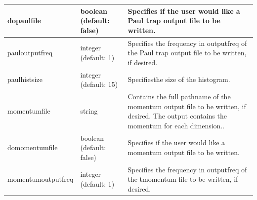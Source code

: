 \documentclass[11pt]{report}
\begin{document}
\begin{tabular}{|p{5.5cm}|p{4cm}|p{6cm}|}
    dopaulfile &
    boolean (default: false) &
    Specifies if the user would like a Paul trap output  file to be written. \\\hline


    pauloutputfreq &
    integer (default: 1) &
    Specifies the frequency in outputfreq of the Paul trap output  file to be written, if desired.\\\hline

    paulhistsize &
    integer (default: 15) &
    Specifiesthe size of the histogram.\\\hline

    momentumfile &
    string &
    Contains the full pathname of the momentum output file to be written, if
    desired.  The output contains the momentum for each dimension..\\\hline

    domomentumfile &
    boolean (default: false) &
    Specifies if the user would like a momentum output  file to be written. \\\hline

    momentumoutputfreq &
    integer (default: 1) &
    Specifies the frequency in outputfreq of the tmomentum  file to be written, if desired.\\\hline

  \end{tabular}
  \newpage
\end{document}
